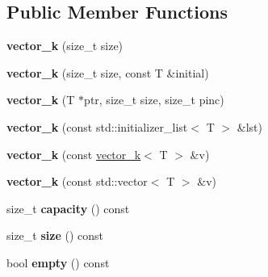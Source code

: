\subsection*{Public Member Functions}
\begin{DoxyCompactItemize}
\item 
\hypertarget{classkeycpp_1_1vector__k_a2fa975294c1ae939afa67863d3b84fc0}{{\bfseries vector\-\_\-k} (size\-\_\-t size)}\label{classkeycpp_1_1vector__k_a2fa975294c1ae939afa67863d3b84fc0}

\item 
\hypertarget{classkeycpp_1_1vector__k_a1f65dfce13d605312c497195081b71fa}{{\bfseries vector\-\_\-k} (size\-\_\-t size, const T \&initial)}\label{classkeycpp_1_1vector__k_a1f65dfce13d605312c497195081b71fa}

\item 
\hypertarget{classkeycpp_1_1vector__k_a6902434fbd3b5ebbbedc1b068c3df3ec}{{\bfseries vector\-\_\-k} (T $\ast$ptr, size\-\_\-t size, size\-\_\-t pinc)}\label{classkeycpp_1_1vector__k_a6902434fbd3b5ebbbedc1b068c3df3ec}

\item 
\hypertarget{classkeycpp_1_1vector__k_a5b6df14409684df91f883c3bb33204f5}{{\bfseries vector\-\_\-k} (const std\-::initializer\-\_\-list$<$ T $>$ \&lst)}\label{classkeycpp_1_1vector__k_a5b6df14409684df91f883c3bb33204f5}

\item 
\hypertarget{classkeycpp_1_1vector__k_a694c6c797022382b57e2d51350e39afc}{{\bfseries vector\-\_\-k} (const \hyperlink{classkeycpp_1_1vector__k}{vector\-\_\-k}$<$ T $>$ \&v)}\label{classkeycpp_1_1vector__k_a694c6c797022382b57e2d51350e39afc}

\item 
\hypertarget{classkeycpp_1_1vector__k_a5e130370253f66d9968c35d41228bef4}{{\bfseries vector\-\_\-k} (const std\-::vector$<$ T $>$ \&v)}\label{classkeycpp_1_1vector__k_a5e130370253f66d9968c35d41228bef4}

\item 
\hypertarget{classkeycpp_1_1vector__k_a651efbae7ea28e3e4cc3a07375a8de72}{size\-\_\-t {\bfseries capacity} () const }\label{classkeycpp_1_1vector__k_a651efbae7ea28e3e4cc3a07375a8de72}

\item 
\hypertarget{classkeycpp_1_1vector__k_a829c7caf8f696e161375d18b715c918a}{size\-\_\-t {\bfseries size} () const }\label{classkeycpp_1_1vector__k_a829c7caf8f696e161375d18b715c918a}

\item 
\hypertarget{classkeycpp_1_1vector__k_abbba6e3a7e0dc425a78645f78417c62c}{bool {\bfseries empty} () const }\label{classkeycpp_1_1vector__k_abbba6e3a7e0dc425a78645f78417c62c}


\end{DoxyCompactItemize}
